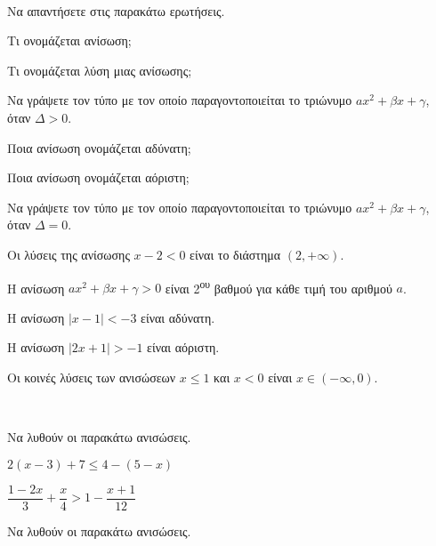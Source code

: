 \documentclass[twoside,nofonts,ektypwsh,math,spyros]{frontisthrio-diag}
\newcommand{\tss}[1]{\textsuperscript{#1}}
\begin{document}
\begin{thema}
\item\mbox{}\\\vspace{-7mm}
\begin{erwthma}
\item Να απαντήσετε στις παρακάτω ερωτήσεις.
\begin{alist}
\item Τι ονομάζεται ανίσωση;
\item Τι ονομάζεται λύση μιας ανίσωσης;
\item Να γράψετε τον τύπο με τον οποίο παραγοντοποιείται το τριώνυμο $ ax^2+\beta x+\gamma $, όταν $ \Delta>0 $.
\item Ποια ανίσωση ονομάζεται αδύνατη;
\item Ποια ανίσωση ονομάζεται αόριστη;
\item Να γράψετε τον τύπο με τον οποίο παραγοντοποιείται το τριώνυμο $ ax^2+\beta x+\gamma $, όταν $ \Delta=0 $. 
\end{alist}
\item \swstolathos
\begin{alist}
\item Οι λύσεις της ανίσωσης $ x-2<0 $ είναι το διάστημα $ (2,+\infty) $.
\item H ανίσωση $ ax^2+\beta x+\gamma>0 $ είναι 2\tss{ου} βαθμού για κάθε τιμή του αριθμού $ a $.
\item Η ανίσωση $ |x-1|<-3 $ είναι αδύνατη.
\item Η ανίσωση $ |2x+1|>-1 $ είναι αόριστη.
\item Οι κοινές λύσεις των ανισώσεων $ x\leq 1 $ και $ x<0 $ είναι $ x\in(-\infty,0) $.
\end{alist}
\end{erwthma}
\item\mbox{}\\\vspace{-7mm}
\begin{erwthma}
\item Να λυθούν οι παρακάτω ανισώσεις.
\begin{multicols}{2}
\begin{alist}
\item $ 2(x-3)+7\leq 4-(5-x) $
\item $ \dfrac{1-2x}{3}+\dfrac{x}{4}>1-\dfrac{x+1}{12} $
\end{alist}
\end{multicols}
\item Να λυθούν οι παρακάτω ανισώσεις.

\end{erwthma}
\end{thema}
\end{document}
